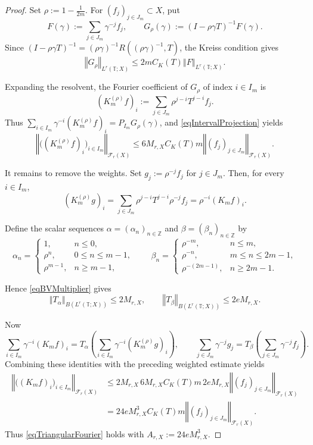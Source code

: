 \documentclass[12pt]{amsart}
\theoremstyle{plain}
\theoremstyle{remark}
\theoremstyle{definition}
\newcommand{\Z}{\mathbb{Z}}
\newcommand{\T}{\mathbb{T}}
\newcommand{\norm}[1]{\left\Vert #1\right\Vert}
\begin{document}
	\begin{proof}
		Set $\rho:=1-\frac1{2m}$. For
		$(f_j)_{j\in J_m} \subset X$, put
		\[
		F(\gamma):=\sum_{j\in J_m}\gamma^{-j}f_j,
		\qquad
		G_\rho(\gamma):=(I-\rho\gamma T)^{-1}F(\gamma).
		\]
		Since $(I-\rho\gamma T)^{-1}
		=(\rho\gamma)^{-1}
		R((\rho\gamma)^{-1},T)$, the Kreiss condition gives
		\[
		\norm{G_\rho}_{L^r(\T;X)}
		\le2mC_K(T)\norm{F}_{L^r(\T;X)}.
		\]
		
		
		
		
		
		Expanding the resolvent, the Fourier coefficient of $G_\rho$ of index
		$i\in I_m$ is
		\[
		(K_m^{(\rho)}f)_i
		:=
		\sum_{j\in J_m}\rho^{j-i}T^{j-i}f_j.
		\]
		Thus $\sum_{i\in I_m}\gamma^{-i}(K_m^{(\rho)}f)_i=P_{I_m}G_\rho(\gamma)$,
		and \eqref{eqIntervalProjection} yields
		\[
		\norm{\bigl((K_m^{(\rho)}f)_i\bigr)_{i\in I_m}}_{\mathcal F_r(X)}
		\le
		6M_{r,X}C_K(T)m
		\norm{(f_j)_{j\in J_m}}_{\mathcal F_r(X)}.
		\]
		
		It remains to remove the weights. Set $g_j:=\rho^{-j}f_j$ for $j\in J_m$.
		Then, for every $i\in I_m$,
		\[
		(K_m^{(\rho)}g)_i
		=
		\sum_{j\in J_m}\rho^{j-i}T^{j-i}\rho^{-j}f_j
		=
		\rho^{-i}(K_mf)_i.
		\]
		
		Define the scalar sequences $\alpha=(\alpha_n)_{n\in\Z}$ and
		$\beta=(\beta_n)_{n\in\Z}$ by
		\[
		\alpha_n=
		\begin{cases}
			1, & n\le0,\\
			\rho^n, & 0\le n\le m-1,\\
			\rho^{m-1}, & n\ge m-1,
		\end{cases}
		\qquad
		\beta_n=
		\begin{cases}
			\rho^{-m}, & n\le m,\\
			\rho^{-n}, & m\le n\le2m-1,\\
			\rho^{-(2m-1)}, & n\ge2m-1.
		\end{cases}
		\]
		
		Hence \eqref{eqBVMultiplier} gives
		\[
		\norm{T_\alpha}_{B(L^r(\T;X))}
		\le 2M_{r,X},
		\qquad
		\norm{T_\beta}_{B(L^r(\T;X))}
		\le 2eM_{r,X}.
		\]
		
		Now
		\[
		\sum_{i\in I_m}\gamma^{-i}(K_mf)_i
		=
		T_\alpha\left(
		\sum_{i\in I_m}\gamma^{-i}(K_m^{(\rho)}g)_i
		\right),
		\qquad
		\sum_{j\in J_m}\gamma^{-j}g_j
		=
		T_\beta\left(
		\sum_{j\in J_m}\gamma^{-j}f_j
		\right).
		\]
		Combining these identities with the preceding weighted estimate yields
		\[
		\begin{aligned}
			\norm{\bigl((K_mf)_i\bigr)_{i\in I_m}}_{\mathcal F_r(X)}
			&\le
			2M_{r,X}\,6M_{r,X}C_K(T)m\,2eM_{r,X}
			\norm{(f_j)_{j\in J_m}}_{\mathcal F_r(X)}
			\\
			&=
			24eM_{r,X}^3C_K(T)m
			\norm{(f_j)_{j\in J_m}}_{\mathcal F_r(X)}.
		\end{aligned}
		\]
		Thus \eqref{eqTriangularFourier} holds with
		$A_{r,X}:=24eM_{r,X}^3$.
	\end{proof}
	
\end{document}
